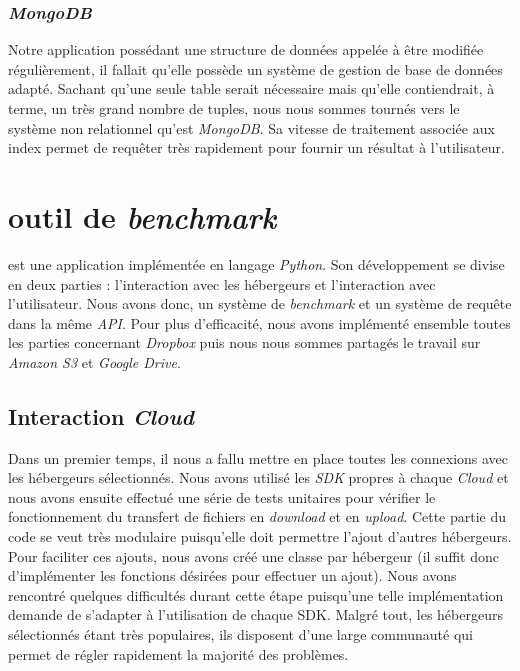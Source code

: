 \documentclass[10pt]{article}
\begin{document}
\subsubsection{\textit{MongoDB}}

Notre application possédant une structure de données appelée à être modifiée
régulièrement, il fallait qu'elle possède un système de gestion de base de
données adapté. Sachant qu'une seule table serait nécessaire mais qu'elle
contiendrait, à terme, un très grand nombre de tuples, nous nous sommes tournés
vers le système non relationnel qu'est \textit{MongoDB}. Sa vitesse de
traitement associée aux index permet de requêter très rapidement pour fournir
un résultat à l'utilisateur.

\section{\KYD outil de \textit{benchmark} }

\KYD est une application implémentée en langage \textit{Python}. Son
développement se divise en deux parties : l'interaction avec les hébergeurs et
l'interaction avec l'utilisateur. Nous avons donc, un système de
\textit{benchmark} et un système de requête dans la même \textit{API}. Pour plus
d'efficacité, nous avons implémenté ensemble toutes les parties concernant
\textit{Dropbox} puis nous nous sommes partagés le travail sur \textit{Amazon
S3} et \textit{Google Drive}.

\subsection{Interaction \textit{Cloud}}

Dans un premier temps, il nous a fallu mettre en place toutes les connexions
avec les hébergeurs sélectionnés. Nous avons utilisé les \textit{SDK} propres à
chaque \textit{Cloud} et nous avons ensuite effectué une série de tests
unitaires pour vérifier le fonctionnement du transfert de fichiers en
\textit{download} et en \textit{upload}. Cette partie du code se veut très modulaire puisqu'elle doit permettre l'ajout
d'autres hébergeurs. Pour faciliter ces ajouts, nous avons créé une classe par
hébergeur (il suffit donc d'implémenter les fonctions désirées pour effectuer un
ajout). Nous avons rencontré quelques difficultés durant cette étape puisqu'une
telle implémentation demande de s'adapter à l'utilisation de chaque SDK. Malgré
tout, les hébergeurs sélectionnés étant très populaires, ils disposent d'une
large communauté qui permet de régler rapidement la majorité des problèmes.
\end{document}
